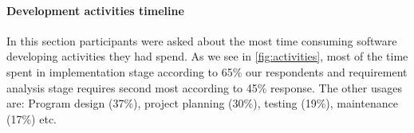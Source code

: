 
\paragraph{Development activities timeline}
In this section participants were asked about the most time consuming software developing activities they had spend. As we see in \ref{fig:activities}, most of the time spent in implementation stage according to 65\% our respondents and requirement analysis stage requires second most according to 45\% response. The other usages are: Program design (37\%), project planning (30\%), testing (19\%), maintenance (17\%) etc.



